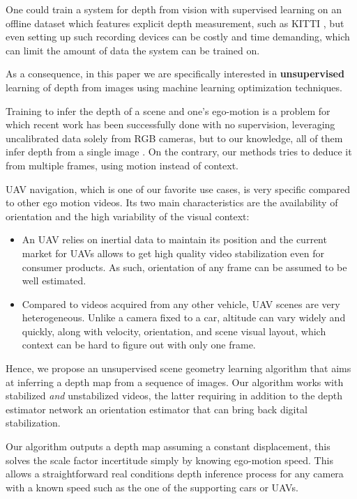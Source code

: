 \documentclass[runningheads]{llncs}
\begin{document}
One could train a system for depth from vision with supervised learning on an offline dataset which features explicit depth measurement, such as KITTI \cite{geiger2013vision}, but even setting up such recording devices can be costly and time demanding, which can limit the amount of data the system can be trained on.

As a consequence, in this paper we are specifically interested in \textbf{unsupervised} learning of depth from images using machine learning optimization techniques.

Training to infer the depth of a scene and one's ego-motion is a problem for which recent work has been successfully done with no supervision, leveraging uncalibrated data solely from RGB cameras, but to our knowledge, all of them infer depth from a single image
\cite{zhou2017unsupervised,yin2018geonet,monodepth17,Vijayanarasimhan17,Mahjourian}. On the contrary, our methods tries to deduce it from multiple frames, using motion instead of context.

UAV navigation, which is one of our favorite use cases, is very specific compared to other ego motion videos. Its two main characteristics are the availability of orientation and the high variability of the visual context:

\begin{itemize}
\item An UAV relies on inertial data to maintain its position and the current market for UAVs allows to get high quality video stabilization even for consumer products. As such, orientation of any frame can be assumed to be well estimated.
\item Compared to videos acquired from any other vehicle,
UAV scenes are very heterogeneous. Unlike a camera fixed to a car, altitude can vary widely and quickly, along with velocity, orientation, and scene
visual layout,
which context can be hard to figure out with only one frame.
\end{itemize}

Hence, we propose an unsupervised scene geometry learning algorithm that aims at inferring a depth map from a sequence of images.
Our algorithm works with stabilized {\em and} unstabilized videos, the latter
requiring in addition to the depth estimator network an orientation estimator that can bring back digital stabilization.

Our algorithm outputs a depth map assuming a constant displacement, this solves the scale factor incertitude simply by knowing ego-motion speed.
This allows a straightforward real conditions depth inference process for any camera with a known speed such as the one of the supporting cars or UAVs.
\end{document}
